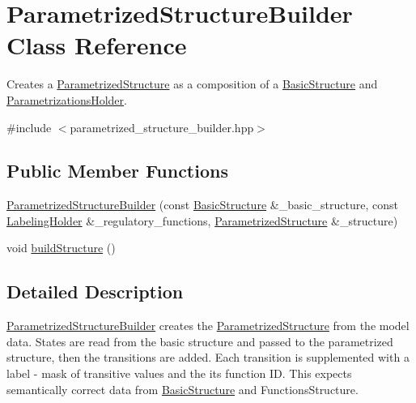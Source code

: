 \hypertarget{classParametrizedStructureBuilder}{\section{\-Parametrized\-Structure\-Builder \-Class \-Reference}
\label{classParametrizedStructureBuilder}
}


\-Creates a \hyperlink{classParametrizedStructure}{\-Parametrized\-Structure} as a composition of a \hyperlink{classBasicStructure}{\-Basic\-Structure} and \hyperlink{classParametrizationsHolder}{\-Parametrizations\-Holder}.  




{\ttfamily \#include $<$parametrized\-\_\-structure\-\_\-builder.\-hpp$>$}

\subsection*{\-Public \-Member \-Functions}
\begin{DoxyCompactItemize}
\item 
\hyperlink{classParametrizedStructureBuilder_a61302c4c0998182eee2674887f2e7eeb}{\-Parametrized\-Structure\-Builder} (const \hyperlink{classBasicStructure}{\-Basic\-Structure} \&\-\_\-basic\-\_\-structure, const \hyperlink{classLabelingHolder}{\-Labeling\-Holder} \&\-\_\-regulatory\-\_\-functions, \hyperlink{classParametrizedStructure}{\-Parametrized\-Structure} \&\-\_\-structure)
\item 
void \hyperlink{classParametrizedStructureBuilder_ab1b302e74bd48de01243fb033abf9898}{build\-Structure} ()
\end{DoxyCompactItemize}


\subsection{\-Detailed \-Description}
\hyperlink{classParametrizedStructureBuilder}{\-Parametrized\-Structure\-Builder} creates the \hyperlink{classParametrizedStructure}{\-Parametrized\-Structure} from the model data. \-States are read from the basic structure and passed to the parametrized structure, then the transitions are added. \-Each transition is supplemented with a label -\/ mask of transitive values and the its function \-I\-D. \-This expects semantically correct data from \hyperlink{classBasicStructure}{\-Basic\-Structure} and \-Functions\-Structure. 

